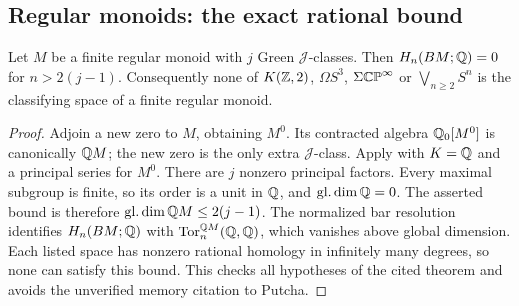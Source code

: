 \subsection{Regular monoids: the exact rational bound}
\begin{proposition}\label{prop:E-regular}
Let $M$ be a finite regular monoid with $j$ Green $\mathcal J$-classes.
Then $H_n(BM;\mathbb Q)=0$ for $n>2(j-1)$.
Consequently none of $K(\mathbb Z,2)$, $\Omega S^3$, $\Sigma\mathbb {CP}^\infty$
or $\bigvee_{n\ge2}S^n$ is the classifying space of a finite regular monoid.
\end{proposition}
\begin{proof}
Adjoin a new zero to $M$, obtaining $M^0$. Its contracted algebra
$\mathbb Q_0[M^0]$ is canonically $\mathbb Q M$; the new zero is the only extra
$\mathcal J$-class. Apply \cite[Theorem 5.13]{martiniansteinberg2025}
with $K=\mathbb Q$ and a principal series for $M^0$. There are $j$ nonzero
principal factors. Every maximal subgroup is finite, so its order is
a unit in $\mathbb Q$, and $\operatorname{gl.dim}\mathbb Q=0$. The asserted
bound is therefore $\operatorname{gl.dim}\mathbb Q M\le2(j-1)$.
The normalized bar resolution identifies $H_n(BM;\mathbb Q)$ with
$\operatorname{Tor}_n^{\mathbb Q M}(\mathbb Q,\mathbb Q)$, which vanishes above global dimension.
Each listed space has nonzero rational homology in infinitely many
degrees, so none can satisfy this bound. This checks all hypotheses
of the cited theorem and avoids the unverified memory citation to Putcha.
\end{proof}


